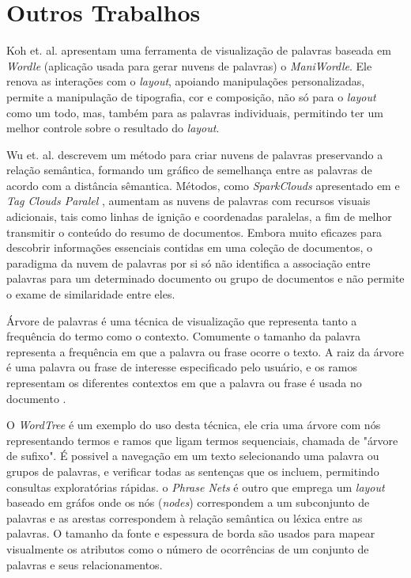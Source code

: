 \section{Outros Trabalhos}

Koh et. al. \cite{koh2010maniwordle} apresentam uma ferramenta de visualização de palavras baseada em \textit{Wordle} (aplicação usada para gerar nuvens de palavras) o \textit{ManiWordle}. Ele renova as interações com o \textit{layout}, apoiando manipulações personalizadas, permite a manipulação de tipografia, cor e composição, não só para o \textit{layout} como um todo, mas, também para as palavras individuais, permitindo ter um melhor controle sobre o resultado do \textit{layout}. 

Wu et. al. \cite{xu2016semantic} descrevem um método para criar nuvens de palavras preservando a relação semântica, formando um gráfico de semelhança entre as palavras  de acordo com a distância sêmantica. Métodos, como \textit{SparkClouds} apresentado em \cite{lee2010sparkclouds} e \textit{Tag Clouds Paralel} \cite{collins2009parallel}, aumentam as nuvens de palavras com recursos visuais adicionais, tais como linhas de ignição e coordenadas paralelas, a fim de melhor transmitir o conteúdo do resumo de documentos.  Embora muito eficazes para descobrir informações essenciais contidas em uma coleção de documentos, o paradigma da nuvem de palavras por si só não identifica a associação entre palavras para um determinado documento ou grupo de documentos e não permite o exame de similaridade entre eles. 

Árvore de palavras é uma técnica de visualização que representa tanto a frequência do termo como o contexto. Comumente o tamanho da palavra representa a frequência em que a palavra ou frase ocorre o texto.  A raiz da árvore é uma palavra ou frase de interesse especificado pelo usuário, e os ramos representam os diferentes contextos em que a palavra ou frase é usada no documento \cite{ward2015interactive}.

O \textit{WordTree} \cite{wattenberg2008word} é um exemplo do uso desta técnica, ele cria uma árvore com nós representando termos e ramos que ligam termos sequenciais, chamada de "árvore de sufixo". É possivel a navegação em um texto selecionando uma palavra ou grupos de palavras, e verificar todas as sentenças que os incluem, permitindo consultas exploratórias rápidas. o \textit{Phrase Nets} \cite{van2009mapping} é outro que emprega um \textit{layout} baseado em gráfos onde os nós (\textit{nodes}) correspondem a um subconjunto de palavras e as arestas correspondem à relação semântica ou léxica entre as palavras. O tamanho da fonte e espessura de borda são usados para mapear visualmente os atributos como o número de ocorrências de um conjunto de palavras e seus relacionamentos. 

